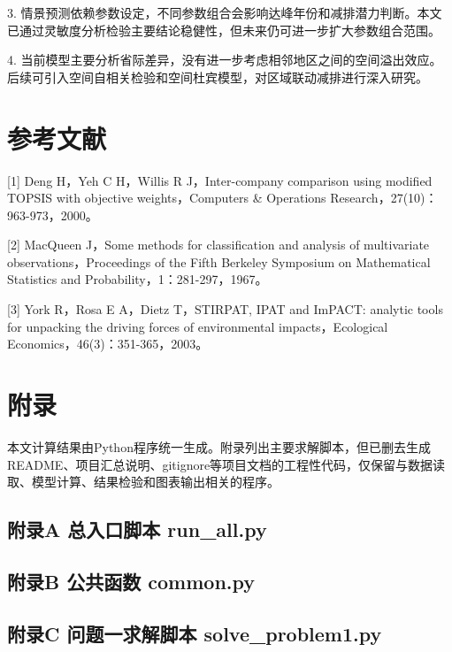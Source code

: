 \documentclass[UTF8,zihao=-4,fontset=windows]{ctexart}
\begin{document}
3. 情景预测依赖参数设定，不同参数组合会影响达峰年份和减排潜力判断。本文已通过灵敏度分析检验主要结论稳健性，但未来仍可进一步扩大参数组合范围。

4. 当前模型主要分析省际差异，没有进一步考虑相邻地区之间的空间溢出效应。后续可引入空间自相关检验和空间杜宾模型，对区域联动减排进行深入研究。

\section*{参考文献}

[1] Deng H，Yeh C H，Willis R J，Inter-company comparison using modified TOPSIS with objective weights，Computers \& Operations Research，27(10)：963-973，2000。

[2] MacQueen J，Some methods for classification and analysis of multivariate observations，Proceedings of the Fifth Berkeley Symposium on Mathematical Statistics and Probability，1：281-297，1967。

[3] York R，Rosa E A，Dietz T，STIRPAT, IPAT and ImPACT: analytic tools for unpacking the driving forces of environmental impacts，Ecological Economics，46(3)：351-365，2003。

\clearpage
\section*{附录}

本文计算结果由Python程序统一生成。附录列出主要求解脚本，但已删去生成README、项目汇总说明、gitignore等项目文档的工程性代码，仅保留与数据读取、模型计算、结果检验和图表输出相关的程序。

\subsection*{附录A 总入口脚本 run\_all.py}

\subsection*{附录B 公共函数 common.py}

\subsection*{附录C 问题一求解脚本 solve\_problem1.py}
\end{document}
